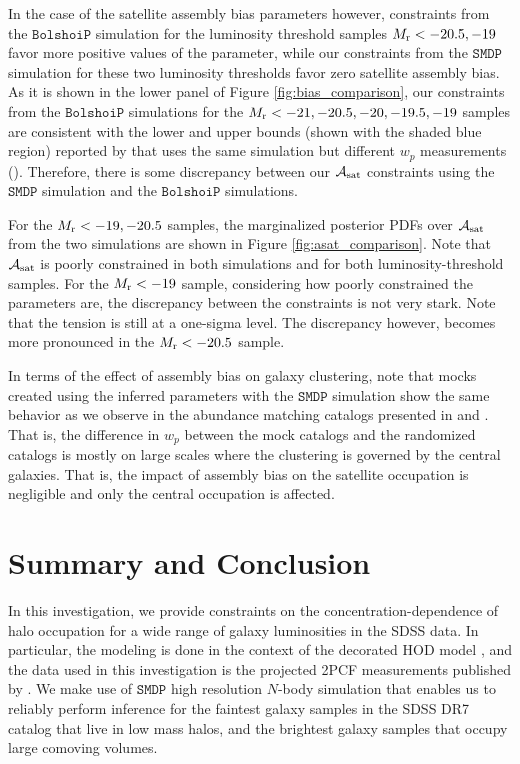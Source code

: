 \documentclass[twocolumn]{aastex61}
\newcommand{\asat}{\mathcal{A}_{\rm sat}}
\begin{document}
In the case of the satellite assembly bias parameters however, constraints from the $\mathtt{BolshoiP}$ simulation for the luminosity threshold samples $M_{\rm r}<-20.5, -19$ favor more positive values of the parameter, while our constraints from the $\mathtt{SMDP}$ simulation for these two luminosity thresholds favor zero satellite assembly bias. As it is shown in the lower panel of Figure \ref{fig:bias_comparison}, our constraints from the $\mathtt{BolshoiP}$ simulations for the $M_{\rm r}<-21, -20.5, -20, -19.5, -19$ samples are consistent with the lower and upper bounds (shown with the shaded blue region) reported by \citet{zentner2016} that uses the same simulation but different $w_{p}$ measurements (\citealt{zehavi2011}). Therefore, there is some discrepancy between our $\asat$ constraints using the $\mathtt{SMDP}$ simulation and the $\mathtt{BolshoiP}$ simulations. 

For the $M_{\rm r}<-19, -20.5$ samples, the marginalized posterior PDFs over $\asat$ from the two simulations are shown in Figure \ref{fig:asat_comparison}. Note that $\asat$ is poorly constrained in both simulations and for both luminosity-threshold samples. For the $M_{\rm r}<-19$ sample, considering how poorly constrained the parameters are, the discrepancy between the constraints is not very stark. Note that the tension is still at a one-sigma level. The discrepancy however, becomes more pronounced in the $M_{\rm r}<-20.5$ sample. 

In terms of the effect of assembly bias on galaxy clustering, note that mocks created using the inferred parameters with the $\mathtt{SMDP}$ simulation show the same behavior as we observe in the abundance matching catalogs presented in \citet{arz2014} and \citet{lehman2015}. That is, the difference in $w_{p}$ between the mock catalogs and the randomized catalogs is mostly on large scales where the clustering is governed by the central galaxies. That is, the impact of assembly bias on the satellite occupation is negligible and only the central occupation is affected.  

\section{Summary and Conclusion}\label{sec:summary}

In this investigation, we provide constraints on the concentration-dependence of halo occupation for a wide range of galaxy luminosities in the SDSS data. In particular, the modeling is done in the context of the decorated HOD model \citet{decorated}, and the data used in this investigation is the projected 2PCF measurements published by \citet{guo2015}. We make use of $\mathtt{SMDP}$ high resolution $N$-body simulation that enables us to reliably perform inference for the faintest galaxy samples in the SDSS DR7 catalog that live in low mass halos, and the brightest galaxy samples that occupy large comoving volumes. 
\end{document}
